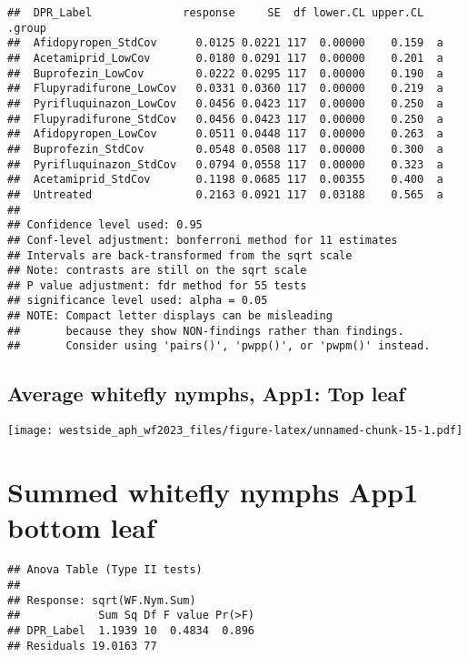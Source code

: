 \documentclass[
]{article}
\begin{document}
\begin{verbatim}
##  DPR_Label              response     SE  df lower.CL upper.CL .group
##  Afidopyropen_StdCov      0.0125 0.0221 117  0.00000    0.159  a    
##  Acetamiprid_LowCov       0.0180 0.0291 117  0.00000    0.201  a    
##  Buprofezin_LowCov        0.0222 0.0295 117  0.00000    0.190  a    
##  Flupyradifurone_LowCov   0.0331 0.0360 117  0.00000    0.219  a    
##  Pyrifluquinazon_LowCov   0.0456 0.0423 117  0.00000    0.250  a    
##  Flupyradifurone_StdCov   0.0456 0.0423 117  0.00000    0.250  a    
##  Afidopyropen_LowCov      0.0511 0.0448 117  0.00000    0.263  a    
##  Buprofezin_StdCov        0.0548 0.0508 117  0.00000    0.300  a    
##  Pyrifluquinazon_StdCov   0.0794 0.0558 117  0.00000    0.323  a    
##  Acetamiprid_StdCov       0.1198 0.0685 117  0.00355    0.400  a    
##  Untreated                0.2163 0.0921 117  0.03188    0.565  a    
## 
## Confidence level used: 0.95 
## Conf-level adjustment: bonferroni method for 11 estimates 
## Intervals are back-transformed from the sqrt scale 
## Note: contrasts are still on the sqrt scale 
## P value adjustment: fdr method for 55 tests 
## significance level used: alpha = 0.05 
## NOTE: Compact letter displays can be misleading
##       because they show NON-findings rather than findings.
##       Consider using 'pairs()', 'pwpp()', or 'pwpm()' instead.
\end{verbatim}

\hypertarget{average-whitefly-nymphs-app1-top-leaf}{%
\subsection{Average whitefly nymphs, App1: Top
leaf}\label{average-whitefly-nymphs-app1-top-leaf}}

\texttt{[image: westside\_aph\_wf2023\_files/figure-latex/unnamed-chunk-15-1.pdf]}

\hypertarget{summed-whitefly-nymphs-app1-bottom-leaf}{%
\section{Summed whitefly nymphs App1 bottom
leaf}\label{summed-whitefly-nymphs-app1-bottom-leaf}}

\begin{verbatim}
## Anova Table (Type II tests)
## 
## Response: sqrt(WF.Nym.Sum)
##            Sum Sq Df F value Pr(>F)
## DPR_Label  1.1939 10  0.4834  0.896
## Residuals 19.0163 77
\end{verbatim}
\end{document}
